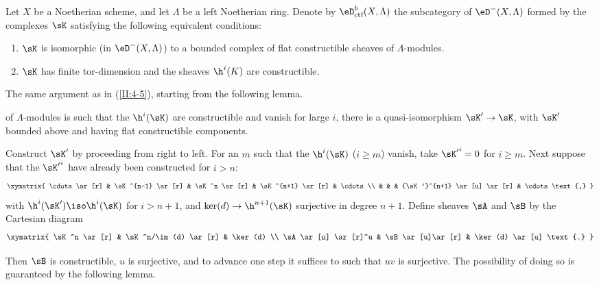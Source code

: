 \begin{prop-def_}\label{II:4-6}
Let $X$ be a Noetherian scheme, and let $\Lambda$ be a left Noetherian ring.
Denote by $\eD_\textnormal{ctf}^b(X,\Lambda)$ the subcategory of
$\eD^-(X,\Lambda)$ formed by the complexes $\sK$ satisfying the following
equivalent conditions:
\begin{enumerate}[\indent i)]
  \item $\sK$ is isomorphic (in $\eD^-(X,\Lambda)$) to a bounded complex of
    flat constructible sheaves of $\Lambda$-modules.
  \item $\sK$ has finite tor-dimension and the sheaves $\h^i(K)$ are
    constructible.
\end{enumerate}
\end{prop-def_}

The same argument as in (\ref{II:4-5}), starting from the following lemma.






\begin{lemma_}\label{II:4-7}
 of $\Lambda$-modules is such that the
$\h^i(\sK)$ are constructible and vanish for large $i$, there is a
quasi-isomorphism $\sK'\to \sK$, with $\sK'$ bounded above and having flat
constructible components.
\end{lemma_}

Construct $\sK'$ by proceeding from right to left. For an $m$ such that the
$\h^i(\sK)$ ($i\geqslant m$) vanish, take ${\sK'}^i = 0$ for
$i\geqslant m$. Next suppose that the ${\sK'}^i$ have already been
constructed for $i>n$:
\[\xymatrix{
  \cdots \ar[r]
    & \sK^{n-1} \ar[r]
    & \sK^n \ar[r]
    & \sK^{n+1} \ar[r]
    & \cdots \\
  & & & {\sK'}^{n+1} \ar[u] \ar[r]
    & \cdots \text{,}
}\]
with $\h^i(\sK')\iso \h^i(\sK)$ for $i>n+1$, and
$\ker(d)\to\h^{n+1}(\sK)$ surjective in degree $n+1$. Define sheaves $\sA$
and $\sB$ by the Cartesian diagram
\[\xymatrix{
  \sK^n \ar[r]
    & \sK^n/\im(d) \ar[r]
    & \ker(d) \\
  \sA \ar[u] \ar[r]^u
    & \sB \ar[u]\ar[r]
    & \ker(d) \ar[u] \text{.}
}\]

Then $\sB$ is constructible, $u$ is surjective, and to advance one step it
suffices to  such that $u v$ is surjective. The possibility of doing so
is guaranteed by the following lemma.






